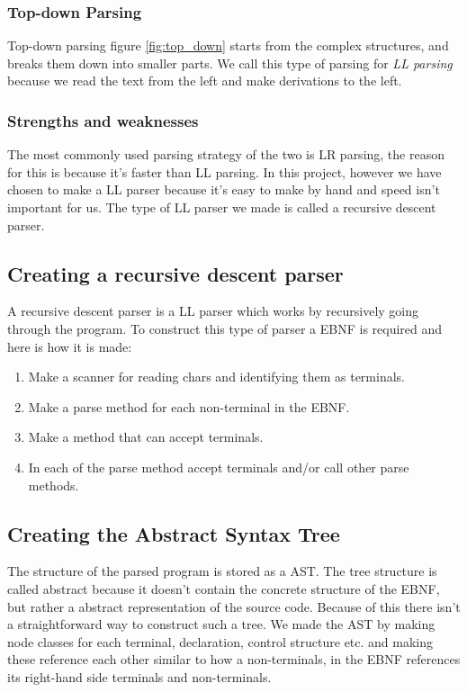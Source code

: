 		\subsubsection*{Top-down Parsing}
			Top-down parsing figure \ref{fig:top_down} starts from the complex structures, and breaks them down into smaller parts.
			We call this type of parsing for {\it LL parsing} because we read the text from the left and make derivations to the left.
		
		\subsubsection*{Strengths and weaknesses}
			The most commonly used parsing strategy of the two is LR parsing, the reason for this is because it's faster than LL parsing.
			In this project, however we have chosen to make a LL parser because it's easy to make by hand and speed isn't important for us. 
			The type of LL parser we made is called a recursive descent parser.
			
	\subsection{Creating a recursive descent parser}
		A recursive descent parser is a LL parser which works by recursively going through the program.
		To construct this type of parser a EBNF is required and here is how it is made:
		\begin{enumerate}
			\item Make a scanner for reading chars and identifying them as terminals.
			\item Make a parse method for each non-terminal in the EBNF.
			\item Make a method that can accept terminals.
			\item In each of the parse method accept terminals and/or call other parse methods.
		\end{enumerate}		
	
	\subsection{Creating the Abstract Syntax Tree}
		The structure of the parsed program is stored as a AST. The tree structure is called abstract because it doesn't contain the concrete
		structure of the EBNF, but rather a abstract representation of the source code. Because of this there isn't a straightforward way to 
		construct such a tree. We made the AST by making node classes for each terminal, declaration, control structure etc. and making these 
		reference each other similar to how a non-terminals, in the EBNF references its right-hand side terminals and non-terminals.
		
		